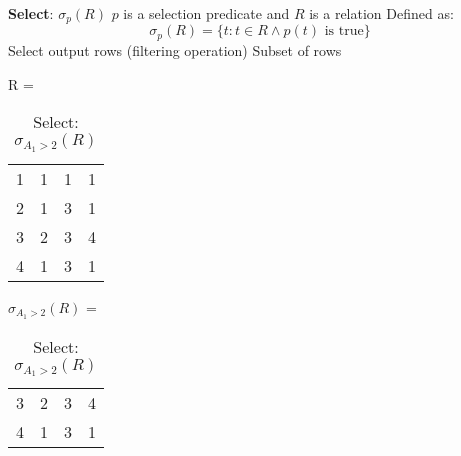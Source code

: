 \documentclass{article}
\begin{document}
\begin{outline}
\begin{example}
\end{example}

       
       
       
       
       
       
       
       
       
       
       
       \1 \textbf{Select}: $\sigma_p(R)$
                \2 $p$ is a selection predicate  and $R$ is a relation
                \2 Defined as:
                \[
                        \sigma_p(R) = \{ t : t \in R \wedge p(t) \textrm{ is true} \}
                \]
                \2 Select output rows  (filtering operation)
                \2 Subset of rows                
                
          
           \begin{example}
           
           
           \begin{table}[!htb]
    \caption{Select: $\sigma_{A_1 >2}(R)$ }
    \begin{minipage}{.5\linewidth}
      \centering
     R =    \begin{tabular}{|c|c|c|c|}
   \hline
  \cellcolor{excel}{$A_1$}  & \cellcolor{excel}{$A_2$}  &   \cellcolor{excel}{$A_3$}
&  \cellcolor{excel}{$A_4$}  \\
  \hline
  1 & 1 & 1  &   1 \\
      \hline
  2 & 1 & 3  &   1 \\
      \hline
  3 & 2 & 3  &   4 \\
      \hline
  4 & 1 & 3  &   1 \\
      \hline
   
\end{tabular}
    \end{minipage}%
    \begin{minipage}{.5\linewidth}
      \centering
      $\sigma_{A_1 >2}(R)$ =    \begin{tabular}{|c|c|c|c|}
   \hline
  \cellcolor{excel}{$A_1$}  & \cellcolor{excel}{$A_2$}  &   \cellcolor{excel}{$A_3$}
&  \cellcolor{excel}{$A_4$}  \\
  \hline
  3 & 2 & 3  &   4 \\
      \hline
  4 & 1 & 3  &   1 \\
      \hline
   

\end{tabular}
\end{minipage}
\end{table}
\end{example}
\end{outline}
\end{document}
